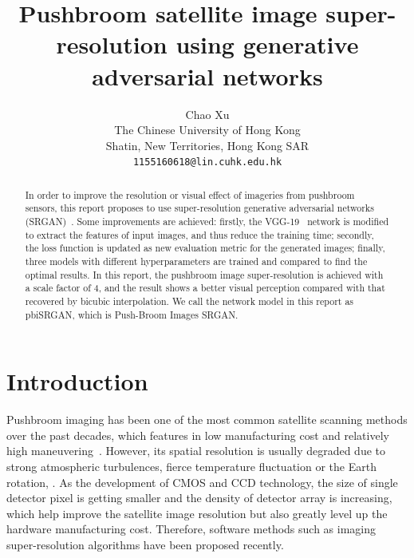 \documentclass[10pt,twocolumn,letterpaper]{article}
\begin{document}
\title{Pushbroom satellite image super-resolution using generative adversarial networks}

\author{Chao Xu\\
The Chinese University of Hong Kong\\
Shatin, New Territories, Hong Kong SAR\\
{\tt\small 1155160618@lin.cuhk.edu.hk}
}
\maketitle

\begin{abstract}
In order to improve the resolution or visual effect of imageries from pushbroom sensors, this report proposes to use super-resolution generative adversarial networks (SRGAN)~\cite{ledig2017photo}. Some improvements are achieved: firstly, the VGG-19~\cite{simonyan2014very} network is modified to extract the features of input images, and thus reduce the training time; secondly, the loss function is updated as new evaluation metric for the generated images; finally, three models with different hyperparameters are trained and compared to find the optimal results. In this report,  the pushbroom image super-resolution is achieved with a scale factor of 4, and the result shows a better visual perception compared with that recovered by bicubic interpolation. We call the network model in this report as pbiSRGAN, which is Push-Broom Images SRGAN.         
\end{abstract}

\section{Introduction}
Pushbroom imaging has been one of the most common satellite scanning methods over the past decades, which features in low manufacturing cost and relatively high maneuvering~\cite{chao2020study}.  However, its spatial resolution is usually degraded due to strong atmospheric turbulences, fierce temperature fluctuation or the Earth rotation, \etal. As the development of CMOS and CCD technology, the size of single detector pixel is getting smaller and the density of detector array is increasing, which help improve the satellite image resolution but also greatly level up the hardware manufacturing cost. Therefore, software methods such as imaging super-resolution algorithms have been proposed recently.
\end{document}

